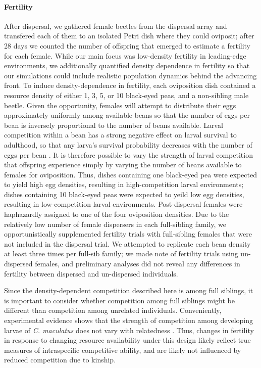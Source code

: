 \documentclass[11pt]{article}
\begin{document}
\paragraph{Fertility}
After dispersal, we gathered female beetles from the dispersal array and transfered each of them to an isolated Petri dish where they could oviposit; after 28 days we counted the number of offspring that emerged to estimate a fertility for each female.
While our main focus was low-density fertility in leading-edge environments, we additionally quantified density dependence in fertility so that our simulations could include realistic population dynamics behind the advancing front.
To induce density-dependence in fertility, each oviposition dish contained a resource density of either 1, 3, 5, or 10 black-eyed peas, and a non-sibling male beetle.
Given the opportunity, females will attempt to distribute their eggs approximately uniformly among available beans \citep{fujii_behavioral_1990} so that the number of eggs per bean is inversely proportional to the number of beans available.
Larval competition within a bean has a strong negative effect on larval survival to adulthood, so that any larva's survival probability decreases with the number of eggs per bean \citep{giga_intraspecific_1991}.
It is therefore possible to vary the strength of larval competition that offspring experience simply by varying the number of beans available to females for oviposition.
Thus, dishes containing one black-eyed pea were expected to yield high egg densities, resulting in high-competition larval environments; dishes containing 10 black-eyed peas were expected to yeild low egg densities, resulting in low-competition larval environments.
Post-dispersal females were haphazardly assigned to one of the four oviposition densities.
Due to the relatively low number of female dispersers in each full-sibling family, we opportunistically supplemented fertility trials with full-sibling females that were not included in the dispersal trial.
We attempted to replicate each bean density at least three times per full-sib family; we made note of fertility trials using un-dispersed females, and preliminary analyses did not reveal any differences in fertility between dispersed and un-dispersed individuals.

Since the density-dependent competition described here is among full siblings, it is important to consider whether competition among full siblings might be different than competition among unrelated individuals.
Conveniently, experimental evidence shows that the strength of competition among developing larvae of \textit{C. maculatus} does not vary with relatedness \citep{smallegange_local_2008}.
Thus, changes in fertility in response to changing resource availability under this design likely reflect true measures of intraspecific competitive ability, and are likely not influenced by reduced competition due to kinship.
\end{document}
